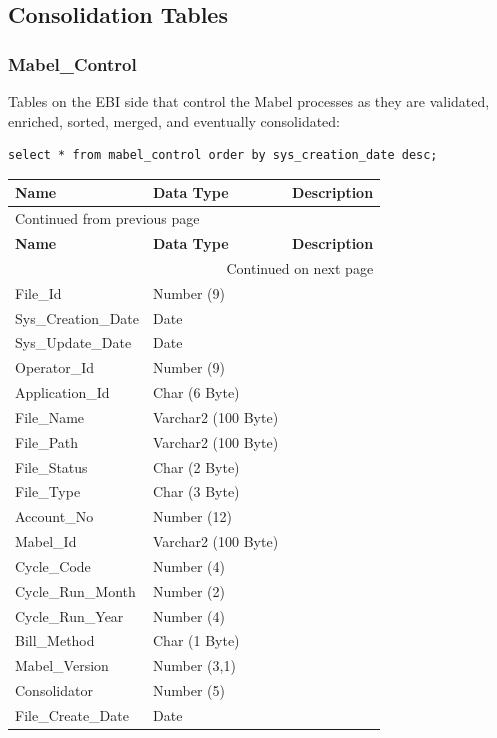 \documentclass[12pt,twoside]{article}
\begin{document}
\subsection{Consolidation Tables}
\label{sec:orgheadline147}
\subsubsection{Mabel\_Control}
\label{sec:orgheadline139}
Tables on the EBI side that control the Mabel processes as they are validated, enriched, sorted, merged, and eventually consolidated:
\begin{verbatim}
select * from mabel_control order by sys_creation_date desc;
\end{verbatim}
\footnotesize
\begin{longtable}{l|l|l}
\hline
\textbf{Name} & \textbf{Data Type} & \textbf{Description}\\
\hline
\endfirsthead
\multicolumn{3}{l}{Continued from previous page} \\
\hline

\textbf{Name} & \textbf{Data Type} & \textbf{Description} \\

\hline
\endhead
\hline\multicolumn{3}{r}{Continued on next page} \\
\endfoot
\endlastfoot
\hline
File\_Id & Number (9) & \\
Sys\_Creation\_Date & Date & \\
Sys\_Update\_Date & Date & \\
Operator\_Id & Number (9) & \\
Application\_Id & Char (6 Byte) & \\
File\_Name & Varchar2 (100 Byte) & \\
File\_Path & Varchar2 (100 Byte) & \\
File\_Status & Char (2 Byte) & \\
File\_Type & Char (3 Byte) & \\
Account\_No & Number (12) & \\
Mabel\_Id & Varchar2 (100 Byte) & \\
Cycle\_Code & Number (4) & \\
Cycle\_Run\_Month & Number (2) & \\
Cycle\_Run\_Year & Number (4) & \\
Bill\_Method & Char (1 Byte) & \\
Mabel\_Version & Number (3,1) & \\
Consolidator & Number (5) & \\
File\_Create\_Date & Date & \\
\hline
\end{longtable}
\end{document}
